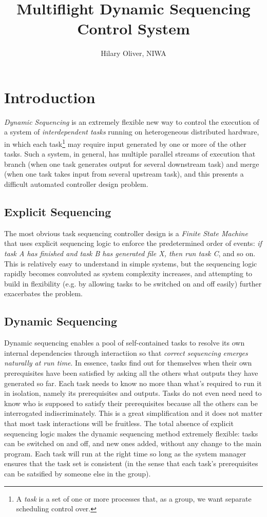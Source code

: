 \documentclass[11pt,a4paper]{report}
\title{Multiflight Dynamic Sequencing Control System}
\author{Hilary Oliver, NIWA}
\begin{document}
\maketitle
\tableofcontents


\chapter{Introduction}

{\em Dynamic Sequencing} is an extremely flexible new way to control the
execution of a system of {\em interdependent tasks} running on
heterogeneous distributed hardware, in which each task\footnote{A {\em
task} is a set of one or more processes that, as a group, we want
separate scheduling control over.} may require input generated by one or
more of the other tasks.  Such a system, in general, has multiple
parallel streams of execution that branch (when one task generates
output for several downstream task) and merge (when one task takes input
from several upstream task), and this presents a difficult automated
controller design problem.

\section{Explicit Sequencing}

The most obvious task sequencing controller design is a {\em Finite
State Machine} that uses explicit sequencing logic to enforce the
predetermined order of events: {\em if task A has finished and task B
has generated file X, then run task C}, and so on. This is relatively
easy to understand in simple systems, but the sequencing logic rapidly
becomes convoluted as system complexity increases, and attempting to
build in flexibility (e.g. by allowing tasks to be switched on and off
easily) further exacerbates the problem.

\section{Dynamic Sequencing}

Dynamic sequencing enables a pool of self-contained tasks to resolve its
own internal dependencies through interactiion so that {\em correct
sequencing emerges naturally at run time}.  In essence, tasks find out
for themselves when their own prerequisites have been satisfied by
asking all the others what outputs they have generated so far.  Each
task needs to know no more than what's required to run it in isolation,
namely its prerequisites and outputs. Tasks do not even need need to
know who is supposed to satisfy their prerequisites because all the
others can be interrogated indiscriminately. This is a great
simplification and it does not matter that most task interactions will
be fruitless.  The total absence of explicit sequencing logic makes the
dynamic sequencing method extremely flexible: tasks can be switched on
and off, and new ones added, without any change to the main program.
Each task will run at the right time so long as the system manager
ensures that the task set is consistent (in the sense that each task's
prerequisites can be satsified by someone else in the group).
\end{document}
